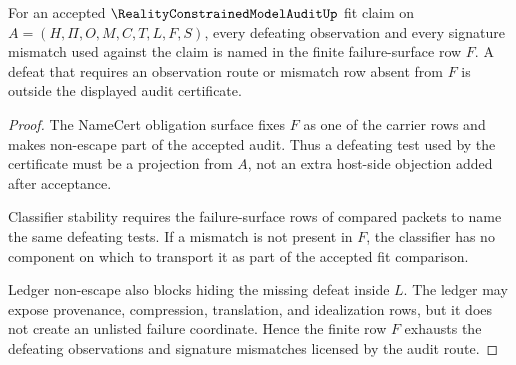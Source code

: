 \begin{theorem}
\label{thm:reality-constrained-model-audit-failure-surface-exhaustion}
For an accepted $\RealityConstrainedModelAuditUp$ fit claim on $A=(H,\Pi,O,M,C,T,L,F,S)$, every defeating observation and every signature mismatch used against the claim is named in the finite failure-surface row $F$. A defeat that requires an observation route or mismatch row absent from $F$ is outside the displayed audit certificate.
\end{theorem}
\begin{proof}
The NameCert obligation surface fixes $F$ as one of the carrier rows and makes non-escape part of the accepted audit. Thus a defeating test used by the certificate must be a projection from $A$, not an extra host-side objection added after acceptance.

Classifier stability requires the failure-surface rows of compared packets to name the same defeating tests. If a mismatch is not present in $F$, the classifier has no component on which to transport it as part of the accepted fit comparison.

Ledger non-escape also blocks hiding the missing defeat inside $L$. The ledger may expose provenance, compression, translation, and idealization rows, but it does not create an unlisted failure coordinate. Hence the finite row $F$ exhausts the defeating observations and signature mismatches licensed by the audit route.
\end{proof}

